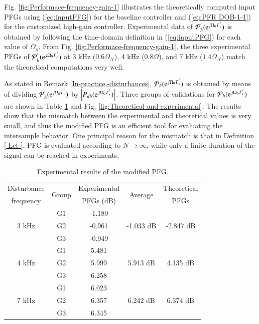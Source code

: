\documentclass [11pt, proquest] {uwthesis}[2020/02/24]
\begin{document}
Fig. \ref{fig:Performace-frequency-gain-1} illustrates the theoretically
computed input PFGs using (\ref{eq:inputPFG}) for the baseline controller
and (\ref{eq:PFR DOB-1-1}) for the customized high-gain controller.
Experimental data of $\mathcal{P}_{h}^{'}(\mathrm{e}^{j\Omega_{0}T_{s}^{'}})$
is obtained by following the time-domain definition in (\ref{eq:inputPFG})
for each value of $\Omega_{o}$. From Fig. \ref{fig:Performace-frequency-gain-1},
the three experimental PFGs of $\mathcal{P}_{h}^{'}(\mathrm{e}^{j\Omega_{0}T_{s}^{'}})$
at 3 kHz ($0.6\Omega_{N}$), 4 kHz ($0.8\Omega$), and 7 kHz ($1.4\Omega_{N}$)
match the theoretical computations very well.

As stated in Remark \ref{In-practice,-disturbances}, $\mathcal{P}_{h}(\mathrm{e}^{j\Omega_{0}T_{s}^{'}})$
is obtained by means of dividing $\mathcal{P}_{h}^{'}(\mathrm{e}^{j\Omega_{0}T_{s}^{'}})$
by $\left|P_{dh}(\mathrm{e}^{j\Omega_{0}T_{s}^{'}})\right|$. Three groups
of validations for $\mathcal{P}_{h}(\mathrm{e}^{j\Omega_{0}T_{s}^{'}})$ are
shown in Table \ref{tab:Experimental-results-of-10} and Fig. \ref{fig:Theoretical-and-experimental}.
The results show that the mismatch between the experimental and theoretical
values is very small, and thus the modified PFG is an efficient tool
for evaluating the intersample behavior. One principal reason for
the mismatch is that in Definition \ref{-Let-}, PFG is evaluated
according to $N\rightarrow\infty$, while only a finite duration of
the signal can be reached in experiments.
\begin{table}[!ht]
\caption{\label{tab:Experimental-results-of-10}Experimental results of the modified
PFG.}
\begin{centering}
\begin{tabular}{@{} ccccc @{}} 
\toprule
Disturbance & \multirow{2}{*}{Group} & Experimental & \multirow{2}{*}{Average} & Theoretical \\
frequency & & PFGs (dB) & & PFGs\\
\midrule
\multirow{3}{*}{3 kHz} & G1 & -1.189 & \multirow{3}{*}{-1.033 dB} & \multirow{3}{*}{-2.847 dB} \\
& G2 & -0.961 &  & \\
& G3 & -0.949 &  & \\
\midrule
\multirow{3}{*}{4 kHz} & G1 & 5.481 & \multirow{3}{*}{5.913 dB} & \multirow{3}{*}{4.135 dB} \\
& G2 & 5.999 &  & \\
& G3 & 6.258 &  & \\
\midrule
\multirow{3}{*}{7 kHz} & G1 & 6.023 & \multirow{3}{*}{6.242 dB} & \multirow{3}{*}{6.374 dB} \\
& G2 & 6.357 &  & \\
& G3 & 6.345 &  & \\
\bottomrule
\end{tabular}
\par\end{centering}
\end{table}
\end{document}
